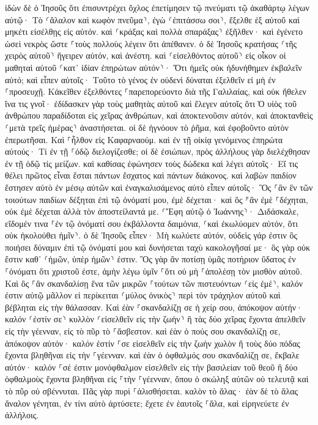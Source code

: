 \documentclass[twoside, 9pt]{extreport}
\begin{document}
ἰδὼν δὲ ὁ Ἰησοῦς ὅτι ἐπισυντρέχει ὄχλος ἐπετίμησεν τῷ πνεύματι τῷ ἀκαθάρτῳ λέγων αὐτῷ· Τὸ ⸂ἄλαλον καὶ κωφὸν πνεῦμα⸃, ἐγὼ ⸂ἐπιτάσσω σοι⸃, ἔξελθε ἐξ αὐτοῦ καὶ μηκέτι εἰσέλθῃς εἰς αὐτόν. 
καὶ ⸂κράξας καὶ πολλὰ σπαράξας⸃ ἐξῆλθεν· καὶ ἐγένετο ὡσεὶ νεκρὸς ὥστε ⸀τοὺς πολλοὺς λέγειν ὅτι ἀπέθανεν. 
ὁ δὲ Ἰησοῦς κρατήσας ⸂τῆς χειρὸς αὐτοῦ⸃ ἤγειρεν αὐτόν, καὶ ἀνέστη. 
καὶ ⸂εἰσελθόντος αὐτοῦ⸃ εἰς οἶκον οἱ μαθηταὶ αὐτοῦ ⸂κατ᾽ ἰδίαν ἐπηρώτων αὐτόν⸃· Ὅτι ἡμεῖς οὐκ ἠδυνήθημεν ἐκβαλεῖν αὐτό; 
καὶ εἶπεν αὐτοῖς· Τοῦτο τὸ γένος ἐν οὐδενὶ δύναται ἐξελθεῖν εἰ μὴ ἐν ⸀προσευχῇ. 
Κἀκεῖθεν ἐξελθόντες ⸀παρεπορεύοντο διὰ τῆς Γαλιλαίας, καὶ οὐκ ἤθελεν ἵνα τις γνοῖ· 
ἐδίδασκεν γὰρ τοὺς μαθητὰς αὐτοῦ καὶ ἔλεγεν αὐτοῖς ὅτι Ὁ υἱὸς τοῦ ἀνθρώπου παραδίδοται εἰς χεῖρας ἀνθρώπων, καὶ ἀποκτενοῦσιν αὐτόν, καὶ ἀποκτανθεὶς ⸂μετὰ τρεῖς ἡμέρας⸃ ἀναστήσεται. 
οἱ δὲ ἠγνόουν τὸ ῥῆμα, καὶ ἐφοβοῦντο αὐτὸν ἐπερωτῆσαι. 
Καὶ ⸀ἦλθον εἰς Καφαρναούμ. καὶ ἐν τῇ οἰκίᾳ γενόμενος ἐπηρώτα αὐτούς· Τί ἐν τῇ ⸀ὁδῷ διελογίζεσθε; 
οἱ δὲ ἐσιώπων, πρὸς ἀλλήλους γὰρ διελέχθησαν ἐν τῇ ὁδῷ τίς μείζων. 
καὶ καθίσας ἐφώνησεν τοὺς δώδεκα καὶ λέγει αὐτοῖς· Εἴ τις θέλει πρῶτος εἶναι ἔσται πάντων ἔσχατος καὶ πάντων διάκονος. 
καὶ λαβὼν παιδίον ἔστησεν αὐτὸ ἐν μέσῳ αὐτῶν καὶ ἐναγκαλισάμενος αὐτὸ εἶπεν αὐτοῖς· 
Ὃς ⸀ἂν ἓν τῶν τοιούτων παιδίων δέξηται ἐπὶ τῷ ὀνόματί μου, ἐμὲ δέχεται· καὶ ὃς ⸁ἂν ἐμὲ ⸀δέχηται, οὐκ ἐμὲ δέχεται ἀλλὰ τὸν ἀποστείλαντά με. 
⸂Ἔφη αὐτῷ ὁ Ἰωάννης⸃· Διδάσκαλε, εἴδομέν τινα ⸀ἐν τῷ ὀνόματί σου ἐκβάλλοντα δαιμόνια, ⸂καὶ ἐκωλύομεν αὐτόν, ὅτι οὐκ ἠκολούθει ἡμῖν⸃. 
ὁ δὲ Ἰησοῦς εἶπεν· Μὴ κωλύετε αὐτόν, οὐδεὶς γάρ ἐστιν ὃς ποιήσει δύναμιν ἐπὶ τῷ ὀνόματί μου καὶ δυνήσεται ταχὺ κακολογῆσαί με· 
ὃς γὰρ οὐκ ἔστιν καθ᾽ ⸂ἡμῶν, ὑπὲρ ἡμῶν⸃ ἐστιν. 
Ὃς γὰρ ἂν ποτίσῃ ὑμᾶς ποτήριον ὕδατος ἐν ⸀ὀνόματι ὅτι χριστοῦ ἐστε, ἀμὴν λέγω ὑμῖν ⸀ὅτι οὐ μὴ ⸀ἀπολέσῃ τὸν μισθὸν αὐτοῦ. 
Καὶ ὃς ⸀ἂν σκανδαλίσῃ ἕνα τῶν μικρῶν ⸀τούτων τῶν πιστευόντων ⸂εἰς ἐμέ⸃, καλόν ἐστιν αὐτῷ μᾶλλον εἰ περίκειται ⸂μύλος ὀνικὸς⸃ περὶ τὸν τράχηλον αὐτοῦ καὶ βέβληται εἰς τὴν θάλασσαν. 
Καὶ ἐὰν ⸀σκανδαλίζῃ σε ἡ χείρ σου, ἀπόκοψον αὐτήν· καλόν ⸂ἐστίν σε⸃ κυλλὸν ⸂εἰσελθεῖν εἰς τὴν ζωὴν⸃ ἢ τὰς δύο χεῖρας ἔχοντα ἀπελθεῖν εἰς τὴν γέενναν, εἰς τὸ πῦρ τὸ ⸀ἄσβεστον. 
καὶ ἐὰν ὁ πούς σου σκανδαλίζῃ σε, ἀπόκοψον αὐτόν· καλόν ἐστίν ⸀σε εἰσελθεῖν εἰς τὴν ζωὴν χωλὸν ἢ τοὺς δύο πόδας ἔχοντα βληθῆναι εἰς τὴν ⸀γέενναν. 
καὶ ἐὰν ὁ ὀφθαλμός σου σκανδαλίζῃ σε, ἔκβαλε αὐτόν· καλόν ⸀σέ ἐστιν μονόφθαλμον εἰσελθεῖν εἰς τὴν βασιλείαν τοῦ θεοῦ ἢ δύο ὀφθαλμοὺς ἔχοντα βληθῆναι εἰς ⸀τὴν ⸀γέενναν, 
ὅπου ὁ σκώληξ αὐτῶν οὐ τελευτᾷ καὶ τὸ πῦρ οὐ σβέννυται. 
Πᾶς γὰρ πυρὶ ⸀ἁλισθήσεται. 
καλὸν τὸ ἅλας· ἐὰν δὲ τὸ ἅλας ἄναλον γένηται, ἐν τίνι αὐτὸ ἀρτύσετε; ἔχετε ἐν ἑαυτοῖς ⸀ἅλα, καὶ εἰρηνεύετε ἐν ἀλλήλοις. 
\end{document}
